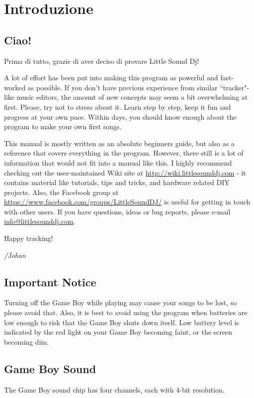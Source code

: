 \chapter{Introduzione}
\section{Ciao!}
Prima di tutto, grazie di aver deciso di provare Little Sound Dj!

A lot of effort has been put into making this program as powerful and fast-worked
as possible. If you don't have previous experience from similar ``tracker"-like
music editors, the amount of new concepts may seem a bit overwhelming at first.
Please, try not to stress about it. Learn step by step, keep it fun and progress
at your own pace. Within days, you should know enough about the
program to make your own first songs.

This manual is mostly written as an absolute beginners guide, but also as a reference
that covers everything in the program. However, there still
is a lot of information that would not fit into a manual like this. I highly recommend
checking out the user-maintained Wiki site at \url{http://wiki.littlesounddj.com} -
it contains material like tutorials, tips and tricks, and
hardware related DIY projects. Also, the Facebook group
at \url{https://www.facebook.com/groups/LittleSoundDJ/} is useful for getting in touch
with other users.
If you have questions, ideas or bug reports, please e-mail
\href{mailto:info@littlesounddj.com}{info@littlesounddj.com}.

Happy tracking!

\textit{/Johan}

\section{Important Notice}

Turning off the Game Boy while playing may cause your songs to be lost, so please avoid that.
Also, it is best to avoid using the program when batteries are low enough to risk that the
Game Boy shuts down itself. Low battery level is indicated by the red light on your Game Boy
becoming faint, or the screen becoming dim.

\section{Game Boy Sound}
The Game Boy sound chip has four channels, each with 4-bit resolution.


